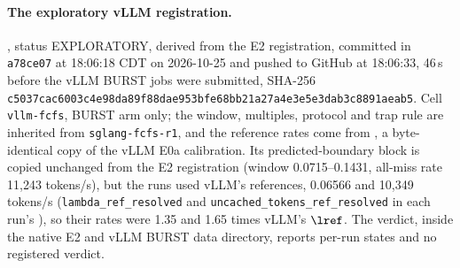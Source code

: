 \paragraph{The exploratory vLLM registration.} , status EXPLORATORY, derived from the E2 registration, committed in \texttt{a78ce07} at 18:06:18 CDT on 2026-10-25 and pushed to GitHub at 18:06:33, 46\,s before the vLLM BURST jobs were submitted, SHA-256 \texttt{c5037cac6003c4e98da89f88dae953bf\allowbreak e68bb21a27a4e3e5e3dab3c8891aeab5}. Cell \texttt{vllm-fcfs}, BURST arm only; the window, multiples, protocol and trap rule are inherited from \texttt{sglang-fcfs-r1}, and the reference rates come from , a byte-identical copy of the vLLM E0a calibration. Its predicted-boundary block is copied unchanged from the E2 registration (window 0.0715--0.1431\sps, all-miss rate 11,243 tokens/s), but the runs used vLLM's references, 0.06566\sps{} and 10,349 tokens/s (\texttt{lambda\_ref\_resolved} and \texttt{uncached\_tokens\_ref\_resolved} in each run's ), so their rates were 1.35 and 1.65 times vLLM's $\lref$. The verdict,  inside the native E2 and vLLM BURST data directory, reports per-run states and no registered verdict.

